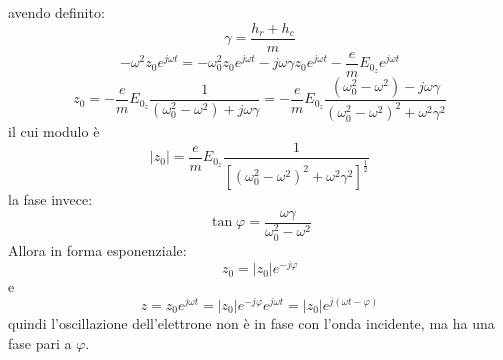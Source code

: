 avendo definito:
\begin{equation}
  \gamma=\frac{h_r+h_c}{m}
\end{equation}
\[
  -\omega^2z_0e^{j\omega t}=-\omega_0^2z_0e^{j\omega t}-j\omega\gamma z_0e^{j\omega t}-\frac{e}{m}E_{0_z}e^{j\omega t}
\]
\[
  z_0=-\frac{e}{m}E_{0_z}\frac{1}{\left(\omega_0^2-\omega^2\right)+j\omega\gamma}=-\frac{e}{m}E_{0_z}\frac{\left(\omega_0^2-\omega^2\right)-j\omega\gamma}{\left(\omega_0^2-\omega^2\right)^2+\omega^2\gamma^2}
\]
il cui modulo è
\[
  |z_0|=\frac{e}{m}E_{0_z}\frac{1}{\left[\left(\omega_0^2-\omega^2\right)^2+\omega^2\gamma^2\right]^{\frac{1}{2}}}
\]
la fase invece:
\begin{equation}
  \tan\varphi=\frac{\omega\gamma}{\omega_0^2-\omega^2}
\end{equation}
Allora in forma esponenziale:
\begin{equation}
  z_0=|z_0|e^{-j\varphi}
\end{equation}
e
\begin{equation}
  z=z_0e^{j\omega t}=|z_0|e^{-j\varphi}e^{j\omega t}=|z_0|e^{j(\omega t-\varphi)}
\end{equation}
quindi l'oscillazione dell'elettrone non è in fase con l'onda incidente, ma ha una fase pari a $\varphi$.
